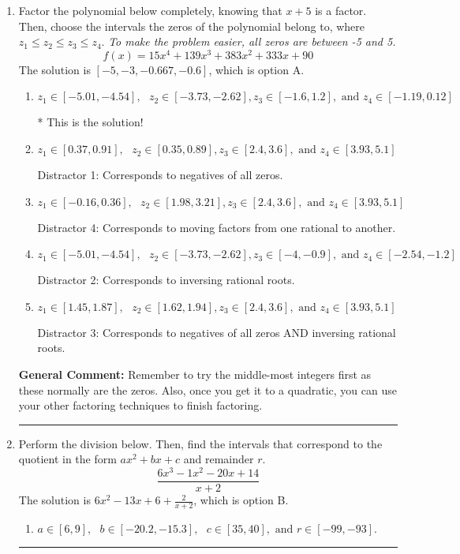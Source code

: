 \documentclass{extbook}[14pt]
\newcommand{\litem}[1]{\item #1

\rule{\textwidth}{0.4pt}}
\begin{document}
\begin{enumerate}\litem{
Factor the polynomial below completely, knowing that $x + 5$ is a factor. Then, choose the intervals the zeros of the polynomial belong to, where $z_1 \leq z_2 \leq z_3 \leq z_4$. \textit{To make the problem easier, all zeros are between -5 and 5.}
\[ f(x) = 15x^{4} +139 x^{3} +383 x^{2} +333 x + 90 \]The solution is \( [-5, -3, -0.667, -0.6] \), which is option A.\begin{enumerate}[label=\Alph*.]
\item \( z_1 \in [-5.01, -4.54], \text{   }  z_2 \in [-3.73, -2.62], z_3 \in [-1.6, 1.2], \text{   and   } z_4 \in [-1.19, 0.12] \)

* This is the solution!
\item \( z_1 \in [0.37, 0.91], \text{   }  z_2 \in [0.35, 0.89], z_3 \in [2.4, 3.6], \text{   and   } z_4 \in [3.93, 5.1] \)

 Distractor 1: Corresponds to negatives of all zeros.
\item \( z_1 \in [-0.16, 0.36], \text{   }  z_2 \in [1.98, 3.21], z_3 \in [2.4, 3.6], \text{   and   } z_4 \in [3.93, 5.1] \)

 Distractor 4: Corresponds to moving factors from one rational to another.
\item \( z_1 \in [-5.01, -4.54], \text{   }  z_2 \in [-3.73, -2.62], z_3 \in [-4, -0.9], \text{   and   } z_4 \in [-2.54, -1.2] \)

 Distractor 2: Corresponds to inversing rational roots.
\item \( z_1 \in [1.45, 1.87], \text{   }  z_2 \in [1.62, 1.94], z_3 \in [2.4, 3.6], \text{   and   } z_4 \in [3.93, 5.1] \)

 Distractor 3: Corresponds to negatives of all zeros AND inversing rational roots.
\end{enumerate}

\textbf{General Comment:} Remember to try the middle-most integers first as these normally are the zeros. Also, once you get it to a quadratic, you can use your other factoring techniques to finish factoring.
}
\litem{
Perform the division below. Then, find the intervals that correspond to the quotient in the form $ax^2+bx+c$ and remainder $r$.
\[ \frac{6x^{3} -1 x^{2} -20 x + 14}{x + 2} \]The solution is \( 6x^{2} -13 x + 6 + \frac{2}{x + 2} \), which is option B.\begin{enumerate}[label=\Alph*.]
\item \( a \in [6, 9], \text{   } b \in [-20.2, -15.3], \text{   } c \in [35, 40], \text{   and   } r \in [-99, -93]. \)


\end{enumerate}}
\end{enumerate}
\end{document}
